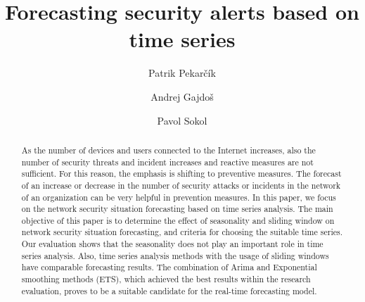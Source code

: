 \documentclass[runningheads]{llncs}
\newcommand{\orcid}[1]{\href{https://orcid.org/#1}{\textcolor[HTML]{A6CE39}{\aiOrcid}}}
\begin{document}
%
\title{Forecasting security alerts based on time series}
%
\author{Patrik Pekar\v{c}\'{i}k\orcid{0000-0002-8818-0960} \and
Andrej Gajdo\v{s}\orcid{0000-0002-7004-6616} \and
Pavol Sokol\orcid{0000-0002-1967-8802}}
%
%
%
\maketitle              %
%
\begin{abstract}
As the number of devices and users connected to the Internet increases, also the number of security threats and incident increases and reactive measures are not sufficient. For this reason, the emphasis is shifting to preventive measures. The forecast of an increase or decrease in the number of security attacks or incidents in the network of an organization can be very helpful in prevention measures. In this paper, we focus on the network security situation forecasting based on time series analysis. The main objective of this paper is to determine the effect of seasonality and sliding window on network security situation forecasting, and criteria for choosing the suitable time series. Our evaluation shows that the seasonality does not play an important role in time series analysis. Also, time series analysis methods with the usage of sliding windows have comparable forecasting results. The combination of Arima and Exponential smoothing methods (ETS), which achieved the best results within the research evaluation, proves to be a suitable candidate for the real-time forecasting model. 


\end{abstract}
%
\end{document}
